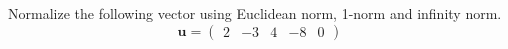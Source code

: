 \documentclass{ximera}
\author{Parisa Fatheddin}
\begin{document}
\begin{exercise}

Normalize the following vector using Euclidean norm, 1-norm and infinity norm. 
\[ \textbf{u} = \begin{pmatrix} 2 & -3& 4 & -8 & 0\end{pmatrix}
\]























\end{exercise}
\end{document}
